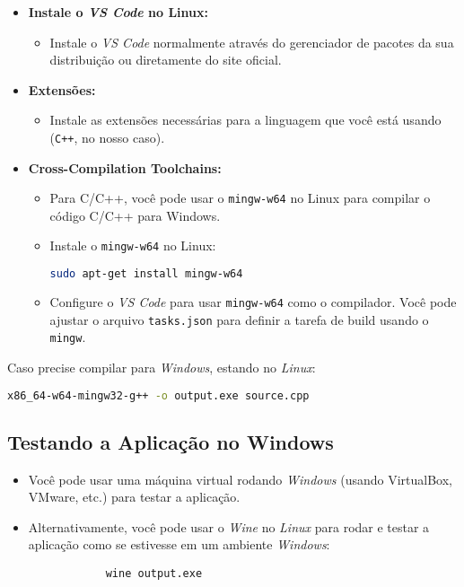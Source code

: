 \documentclass[a4paper,11pt]{article}
\newcommand{\vscode}{\textit{VS Code}}
\newcommand{\windows}{\textit{Windows}}
\newcommand{\linux}{\textit{Linux}}
\begin{document}
\begin{itemize}
	\item \textbf{Instale o \vscode{} no Linux:} 
	\begin{itemize}
		\item Instale o \vscode{} normalmente através do gerenciador de pacotes da sua distribuição ou diretamente do site oficial.
	\end{itemize}
	
	\item \textbf{Extensões:} 
	\begin{itemize}
		\item Instale as extensões necessárias para a linguagem que você está usando (\texttt{C++}, no nosso caso).
	\end{itemize}
	
	\item \textbf{Cross-Compilation Toolchains:}
	\begin{itemize}
		\item Para C/C++, você pode usar o \texttt{mingw-w64} no Linux para compilar o código C/C++ para Windows.
		\item Instale o \texttt{mingw-w64} no Linux:
		\begin{lstlisting}[language=bash]
			sudo apt-get install mingw-w64
		\end{lstlisting}
		\item Configure o \vscode{} para usar \texttt{mingw-w64} como o compilador. Você pode ajustar o arquivo \texttt{tasks.json} para definir a tarefa de build usando o \texttt{mingw}.
	\end{itemize}
\end{itemize}


Caso precise compilar para \windows{}, estando no \linux{}:

\begin{lstlisting}[language=bash]
	x86_64-w64-mingw32-g++ -o output.exe source.cpp
\end{lstlisting}


\subsection{Testando a Aplicação no Windows}


	\begin{itemize}
		\item Você pode usar uma máquina virtual rodando \windows{} (usando VirtualBox, VMware, etc.) para testar a aplicação.
		\item Alternativamente, você pode usar o \textit{Wine} no \linux{} para rodar e testar a aplicação como se estivesse em um ambiente \windows{}:
		\begin{lstlisting}
			wine output.exe
		\end{lstlisting}
	\end{itemize}
\end{document}
